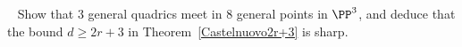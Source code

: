 %
%
%
%


\begin{exercise}~\label{2r+3 is sharp}
Show that 3 general quadrics meet in 8 general points in $\PP^3$, and deduce that the bound $d \geq 2r+3$ in Theorem~\ref{Castelnuovo2r+3}
is sharp.
\end{exercise}

